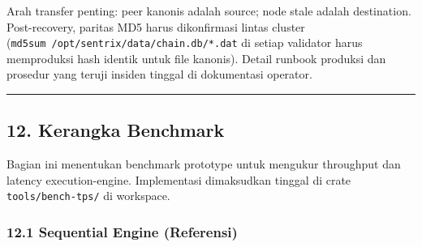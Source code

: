 \documentclass[11pt,a4paper]{article}
\begin{document}
Arah transfer penting: peer kanonis adalah source; node stale adalah destination. Post-recovery, paritas MD5 harus dikonfirmasi lintas cluster (\texttt{md5sum\ /opt/sentrix/data/chain.db/*.dat} di setiap validator harus memproduksi hash identik untuk file kanonis). Detail runbook produksi dan prosedur yang teruji insiden tinggal di dokumentasi operator.

\begin{center}\rule{0.5\linewidth}{0.5pt}\end{center}

\hypertarget{kerangka-benchmark}{%
\subsection{12. Kerangka Benchmark}\label{kerangka-benchmark}}

Bagian ini menentukan benchmark prototype untuk mengukur throughput dan latency execution-engine. Implementasi dimaksudkan tinggal di crate \texttt{tools/bench-tps/} di workspace.

\hypertarget{sequential-engine-referensi}{%
\subsubsection{12.1 Sequential Engine (Referensi)}\label{sequential-engine-referensi}}
\end{document}
